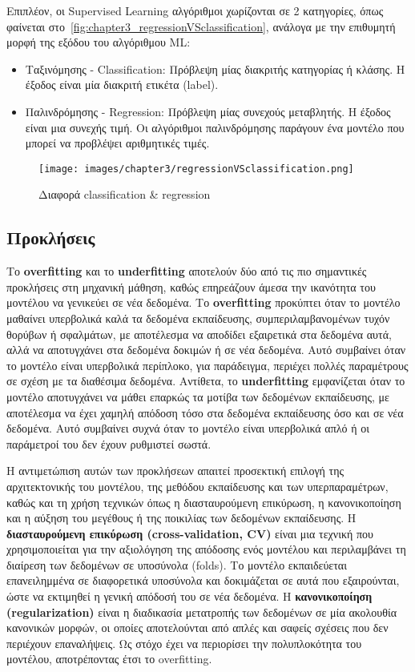 Επιπλέον, οι Supervised Learning αλγόριθμοι χωρίζονται σε 2 κατηγορίες, όπως φαίνεται στο~\autoref{fig:chapter3_regressionVSclassification}, ανάλογα
με την επιθυμητή μορφή της εξόδου του αλγόριθμου ML:
\begin{itemize}
  \item{Ταξινόμησης - Classification: Πρόβλεψη μίας διακριτής κατηγορίας ή κλάσης. Η έξοδος είναι μία διακριτή ετικέτα (label).}
  \item{Παλινδρόμησης - Regression: Πρόβλεψη μίας συνεχούς μεταβλητής. Η έξοδος είναι μια συνεχής τιμή. Οι αλγόριθμοι παλινδρόμησης παράγουν ένα μοντέλο που μπορεί να προβλέψει αριθμητικές τιμές.}
\end{itemize}

\begin{figure}[H]
    \centering
    \texttt{[image: images/chapter3/regressionVSclassification.png]}
    \caption{Διαφορά classification \& regression}
    \label{fig:chapter3_regressionVSclassification}
\end{figure}

\subsection{Προκλήσεις}
Το \textbf{overfitting} και το \textbf{underfitting} αποτελούν δύο από τις πιο σημαντικές προκλήσεις στη μηχανική μάθηση, καθώς επηρεάζουν άμεσα την ικανότητα του μοντέλου να γενικεύει σε νέα δεδομένα. Το \textbf{overfitting} προκύπτει όταν το μοντέλο μαθαίνει υπερβολικά καλά τα δεδομένα εκπαίδευσης, συμπεριλαμβανομένων τυχόν θορύβων ή σφαλμάτων, με αποτέλεσμα να αποδίδει εξαιρετικά στα δεδομένα αυτά, αλλά να αποτυγχάνει στα δεδομένα δοκιμών ή σε νέα δεδομένα. Αυτό συμβαίνει όταν το μοντέλο είναι υπερβολικά περίπλοκο, για παράδειγμα, περιέχει πολλές παραμέτρους σε σχέση με τα διαθέσιμα δεδομένα. Αντίθετα, το \textbf{underfitting} εμφανίζεται όταν το μοντέλο αποτυγχάνει να μάθει επαρκώς τα μοτίβα των δεδομένων εκπαίδευσης, με αποτέλεσμα να έχει χαμηλή απόδοση τόσο στα δεδομένα εκπαίδευσης όσο και σε νέα δεδομένα. Αυτό συμβαίνει συχνά όταν το μοντέλο είναι υπερβολικά απλό ή οι παράμετροί του δεν έχουν ρυθμιστεί σωστά. 

Η αντιμετώπιση αυτών των προκλήσεων απαιτεί προσεκτική επιλογή της αρχιτεκτονικής του μοντέλου, της μεθόδου εκπαίδευσης και των υπερπαραμέτρων, καθώς και τη χρήση τεχνικών όπως η διασταυρούμενη επικύρωση, η κανονικοποίηση και η αύξηση του μεγέθους ή της ποικιλίας των δεδομένων εκπαίδευσης. Η \textbf{διασταυρούμενη επικύρωση (cross-validation, CV)} είναι μια τεχνική που χρησιμοποιείται για την αξιολόγηση της απόδοσης ενός μοντέλου και περιλαμβάνει τη διαίρεση των δεδομένων σε υποσύνολα (folds). Το μοντέλο εκπαιδεύεται επανειλημμένα σε διαφορετικά υποσύνολα και δοκιμάζεται σε αυτά που εξαιρούνται, ώστε να εκτιμηθεί η γενική απόδοσή του σε νέα δεδομένα. Η \textbf{κανονικοποίηση (regularization)} είναι η διαδικασία μετατροπής των δεδομένων σε μία ακολουθία κανονικών μορφών, οι οποίες αποτελούνται από απλές και σαφείς σχέσεις που δεν περιέχουν επαναλήψεις. Ως στόχο έχει να περιορίσει την πολυπλοκότητα του μοντέλου, αποτρέποντας έτσι το overfitting.

